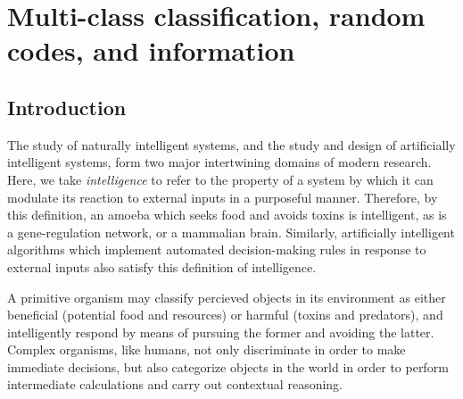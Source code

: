 
\chapter{Multi-class classification, random codes, and information} %

\label{Chapter1} %


\newcommand{\keyword}[1]{\textbf{#1}}
\newcommand{\tabhead}[1]{\textbf{#1}}
\newcommand{\code}[1]{\texttt{#1}}
\newcommand{\file}[1]{\texttt{\bfseries#1}}
\newcommand{\option}[1]{\texttt{\itshape#1}}



\section{Introduction}

The study of naturally intelligent systems, and the study and design
of artificially intelligent systems, form two major intertwining
domains of modern research.  Here, we take \emph{intelligence} to
refer to the property of a system by which it can modulate its
reaction to external inputs in a purposeful manner.  Therefore, by
this definition, an amoeba which seeks food and avoids toxins is
intelligent, as is a gene-regulation network, or a mammalian brain.
Similarly, artificially intelligent algorithms which implement
automated decision-making rules in response to external inputs also
satisfy this definition of intelligence.

A primitive organism may classify percieved objects in its environment
as either beneficial (potential food and resources) or harmful (toxins
and predators), and intelligently respond by means of pursuing the
former and avoiding the latter.  %
Complex organisms, like humans, not
only discriminate in order to make immediate decisions, but also
categorize objects in the world in order to perform intermediate
calculations and carry out contextual reasoning.



